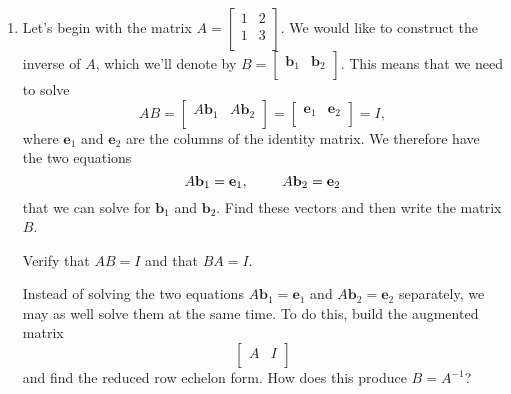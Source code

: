 \documentclass[12pt]{article}
\newcommand{\vs}[1]{\vspace{#1in}}
\newcommand{\bvec}{{\mathbf b}}
\newcommand{\evec}{{\mathbf e}}
\newcommand{\mattwo}[4]{\left[\begin{array}{rr}#1 & #2 \\ #3 & #4 \\ \end{array}\right]}
\begin{document}
\begin{enumerate}
    \vs{1}
  \item Let's begin with the matrix
    $
    A = \mattwo1213
    $.
    We would like to construct the inverse of $A$, which we'll denote by
    $B = \left[
      \begin{array}{cc} \bvec_1 & \bvec_2
        \\ \end{array}\right].
    $
    This means that we need to solve
    $$
    AB = \left[
      \begin{array}{cc}
        A\bvec_1 & A\bvec_2 \\
      \end{array}
    \right]
    = \left[
      \begin{array}{cc}
        \evec_1 & \evec_2 \\
      \end{array}
    \right] = I,
    $$
    where $\evec_1$ and $\evec_2$ are the columns of the identity matrix.
    We therefore have the two equations
    $$
    A\bvec_1 = \evec_1, \hspace*{24pt}
    A\bvec_2 = \evec_2
    $$
    that we can solve for $\bvec_1$ and $\bvec_2$.  Find these vectors
    and then write the matrix $B$.

    \vs{1}
    Verify that $AB = I$ and that $BA = I$.

    \vs{1}
    Instead of solving the two equations $A\bvec_1 = \evec_1$ and
    $A\bvec_2 = \evec_2$ separately, we may as well solve them at the
    same time.  To do this, build the augmented matrix
    $$
    \left[
      \begin{array}{c|c}
        A & I \\
      \end{array}
    \right]
    $$
    and find the reduced row echelon form.  How does this produce $B =
    A^{-1}$?  

                   
              
    
    


\end{enumerate}
\end{document}
